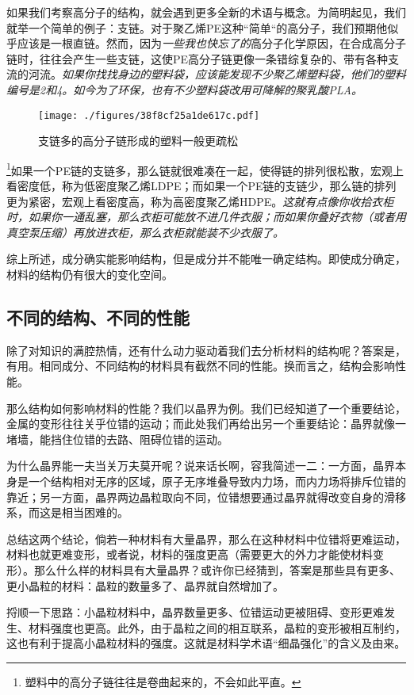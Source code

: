 如果我们考察高分子的结构，就会遇到更多全新的术语与概念。为简明起见，我们就举一个简单的例子：支链。对于聚乙烯PE这种“简单“的高分子，我们预期他似乎应该是一根直链。然而，因为\textsl{一些我也快忘了的}高分子化学原因，在合成高分子链时，往往会产生一些支链，这使PE高分子链更像一条错综复杂的、带有各种支流的河流。\textsl{如果你找找身边的塑料袋，应该能发现不少聚乙烯塑料袋，他们的塑料编号是2和4。如今为了环保，也有不少塑料袋改用可降解的聚乳酸PLA。}
\begin{figure}[ht]
\centering
\texttt{[image: ./figures/38f8cf25a1de617c.pdf]}
\caption{支链多的高分子链形成的塑料一般更疏松} \label{fig_MSEINT_4}
\end{figure}
\footnote{塑料中的高分子链往往是卷曲起来的，不会如此平直。}如果一个PE链的支链多，那么链就很难凑在一起，使得链的排列很松散，宏观上看密度低，称为低密度聚乙烯LDPE；而如果一个PE链的支链少，那么链的排列更为紧密，宏观上看密度高，称为高密度聚乙烯HDPE。\textsl{这就有点像你收拾衣柜时，如果你一通乱塞，那么衣柜可能放不进几件衣服；而如果你叠好衣物（或者用真空泵压缩）再放进衣柜，那么衣柜就能装不少衣服了。}

综上所述，成分确实能影响结构，但是成分并不能唯一确定结构。即使成分确定，材料的结构仍有很大的变化空间。
 
\subsection{不同的结构、不同的性能}

除了对知识的满腔热情，还有什么动力驱动着我们去分析材料的结构呢？答案是，有用。相同成分、不同结构的材料具有截然不同的性能。换而言之，结构会影响性能。

那么结构如何影响材料的性能？我们以晶界为例。我们已经知道了一个重要结论，金属的变形往往关乎位错的运动；而此处我们再给出另一个重要结论：晶界就像一堵墙，能挡住位错的去路、阻碍位错的运动。

为什么晶界能一夫当关万夫莫开呢？说来话长啊，容我简述一二：一方面，晶界本身是一个结构相对无序的区域，原子无序堆叠导致内力场，而内力场将排斥位错的靠近；另一方面，晶界两边晶粒取向不同，位错想要通过晶界就得改变自身的滑移系，而这是相当困难的。

总结这两个结论，倘若一种材料有大量晶界，那么在这种材料中位错将更难运动，材料也就更难变形，或者说，材料的强度更高（需要更大的外力才能使材料变形）。那么什么样的材料具有大量晶界？或许你已经猜到，答案是那些具有更多、更小晶粒的材料：晶粒的数量多了、晶界就自然增加了。

捋顺一下思路：小晶粒材料中，晶界数量更多、位错运动更被阻碍、变形更难发生、材料强度也更高。此外，由于晶粒之间的相互联系，晶粒的变形被相互制约，这也有利于提高小晶粒材料的强度。这就是材料学术语“细晶强化”的含义及由来。

